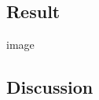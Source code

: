 \documentclass[paper=a4, fontsize=11pt]{scrartcl} %
\numberwithin{equation}{section} %
\numberwithin{figure}{section} %
\numberwithin{table}{section} %
\begin{document}
\subsection{Result}

image


\subsection{Discussion}


\end{document}
